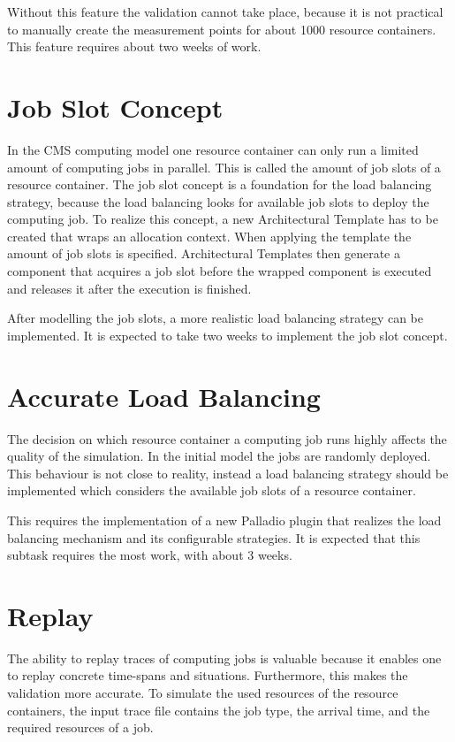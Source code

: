 Without this feature the validation cannot take place, because it is not practical to manually create the measurement points for about 1000 resource containers. This feature requires about two weeks of work.

\section{Job Slot Concept}
In the CMS computing model one resource container can only run a limited amount of computing jobs in parallel. This is called the amount of job slots of a resource container. The job slot concept is a foundation for the load balancing strategy, because the load balancing looks for available job slots to deploy the computing job. To realize this concept, a new Architectural Template has to be created that wraps an allocation context. When applying the template the amount of job slots is specified. Architectural Templates then generate a component that acquires a job slot before the wrapped component is executed and releases it after the execution is finished.

After modelling the job slots, a more realistic load balancing strategy can be implemented. It is expected to take two weeks to implement the job slot concept. 
\clearpage
\section{Accurate Load Balancing}
\label{scheduling}
The decision on which resource container a computing job runs highly affects the quality of the simulation. In the initial model the jobs are randomly deployed. This behaviour is not close to reality, instead a load balancing strategy should be implemented which considers the available job slots of a resource container. 

This requires the implementation of a new Palladio plugin that realizes the load balancing mechanism and its configurable strategies.
It is expected that this subtask requires the most work, with about 3 weeks.

\section{Replay}
The ability to replay traces of computing jobs is valuable because it enables one to replay concrete time-spans and situations. Furthermore, this makes the validation more accurate. To simulate the used resources of the resource containers, the input trace file contains the job type, the arrival time, and the required resources of a job.

